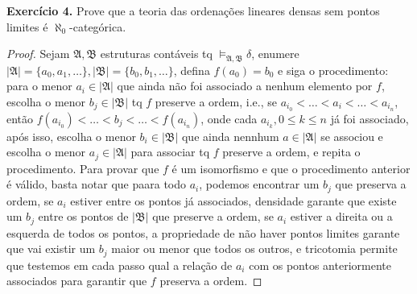 \documentclass[11pt]{article}
\newcommand{\mf}[1]{\mathfrak{#1}}
\begin{document}
\begin{shaded}
\textbf{Exercício 4.} Prove que a teoria das ordenações lineares densas sem pontos limites é $\aleph_0$-categórica.
\end{shaded}

\begin{proof}
    Sejam $\mf{A},\mf{B}$ estruturas contáveis tq $\vDash_{\mf{A},\mf{B}}\delta$, enumere $|\mf{A}|=\{a_0,a_1,\dots\},|\mf{B}|=\{b_0,b_1,\dots\}$, defina $f(a_0)=b_0$ e siga o procedimento: para o menor $a_i\in|\mf{A}|$ que ainda não foi associado a nenhum elemento por $f$, escolha o menor $b_j\in|\mf{B}|$ tq $f$ preserve a ordem, i.e., se $a_{i_0}<\dots<a_i<\dots<a_{i_n}$, então $f(a_{i_0})<\dots<b_j<\dots<f(a_{i_n})$, onde cada $a_{i_k},0\leq k\leq n$ já foi associado, após isso, escolha o menor $b_i\in|\mf{B}|$ que ainda nennhum $a\in|\mf{A}|$ se associou e escolha o menor $a_j\in|\mf{A}|$ para associar tq $f$ preserve a ordem, e repita o procedimento. Para provar que $f$ é um isomorfismo e que o procedimento anterior é válido, basta notar que paara todo $a_i$, podemos encontrar um $b_j$ que preserva a ordem, se $a_i$ estiver entre os pontos já associados, densidade garante que existe um $b_j$ entre os pontos de $|\mf{B}|$ que preserve a ordem, se $a_i$ estiver a direita ou a esquerda de todos os pontos, a propriedade de não haver pontos limites garante que vai existir um $b_j$ maior ou menor que todos os outros, e tricotomia permite que testemos em cada passo qual a relação de $a_i$ com os pontos anteriormente associados para garantir que $f$ preserva a ordem.
\end{proof}
\end{document}
